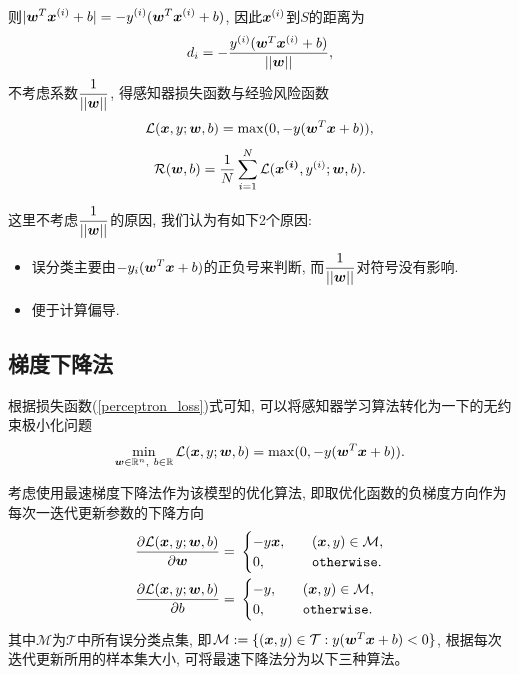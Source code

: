 \documentclass[12pt, a4paper, oneside]{ctexart}
\begin{document}
则$\displaystyle |\boldsymbol{w}^T\boldsymbol{x}^{(i)}+b| = -y^{(i)}(\boldsymbol{w}^T\boldsymbol{x}^{(i)}+b)$, 因此$\boldsymbol{x}^{(i)}$到$S$的距离为
\begin{equation}
    d_i = -\frac{y^{(i)}(\boldsymbol{w}^T\boldsymbol{x}^{(i)}+b)}{||\boldsymbol{w}||},
\end{equation}
不考虑系数$\displaystyle\frac{1}{||\boldsymbol{w}||}$, 得感知器损失函数与经验风险函数
\begin{equation}\label{perceptron_loss}
    \mathcal{L}(\boldsymbol{x}, y;\boldsymbol{w}, b)=\max(0, -y(\boldsymbol{w}^T\boldsymbol{x}+b)),
\end{equation}
\begin{equation}\label{perceptron_risk}
    \mathcal{R}(\boldsymbol{w}, b)=\frac{1}{N}\sum_{i=1}^N\mathcal{L}(\boldsymbol{x^{(i)}}, y^{(i)}; \boldsymbol{w}, b).
\end{equation}

这里不考虑$\displaystyle\frac{1}{||\boldsymbol{w}||}$的原因, 我们认为有如下2个原因: 
\begin{itemize}
    \item 误分类主要由$\displaystyle -y_i(\boldsymbol{w}^T\boldsymbol{x}+b)$的正负号来判断, 而$\displaystyle\frac{1}{||\boldsymbol{w}||}$对符号没有影响.
    \item 便于计算偏导.
\end{itemize}
\subsection{梯度下降法}
根据损失函数(\ref{perceptron_loss})式可知, 可以将感知器学习算法转化为一下的无约束极小化问题
\begin{equation}
    \min_{\boldsymbol{w}\in\mathbb{R}^n, \ b\in\mathbb{R}}\mathcal{L}(\boldsymbol{x}, y;\boldsymbol{w}, b)=\max(0, -y(\boldsymbol{w}^T\boldsymbol{x}+b)).
\end{equation}

考虑使用最速梯度下降法作为该模型的优化算法, 即取优化函数的负梯度方向作为每次一迭代更新参数的下降方向
\begin{align}
    \frac{\partial \L(\bd{x}, y; \bd{w}, b)}{\partial \bd{w}} =&\ \begin{cases}
        -y\bd{x}, &\quad (\bd{x}, y)\in \mathcal{M},\\
        0, &\quad \mathtt{otherwise}.\\
    \end{cases}\\
    \frac{\partial \L(\bd{x}, y; \bd{w}, b)}{\partial b} =&\ \begin{cases}
        -y, &\quad (\bd{x}, y)\in \mathcal{M},\\
        0, &\quad \mathtt{otherwise}.\\
    \end{cases}
\end{align}
其中$\mathcal{M}$为$\mathcal{T}$中所有误分类点集, 即$\mathcal{M} := \{(\boldsymbol{x}, y)\in\mathcal{T}:y(\boldsymbol{w}^T\boldsymbol{x}+b) < 0\}$, 根据每次迭代更新所用的样本集大小, 可将最速下降法分为以下三种算法。
\end{document}
